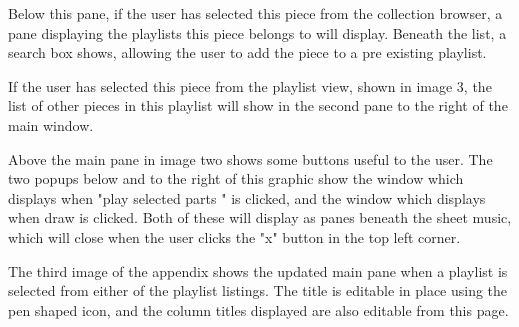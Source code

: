 \documentclass[bibtotocnumbered]{article}
\begin{document}
Below this pane, if the user has selected this piece from the collection browser, a pane displaying the playlists this piece belongs to will display.  Beneath the list, a search box shows, allowing the user to add the piece to a pre existing playlist.

If the user has selected this piece from the playlist view, shown in image 3, the list of other pieces in this playlist will show in the second pane to the right of the main window.

Above the main pane in image two shows some buttons useful to the user. The two popups below and to the right of this graphic show the window which displays when "play selected parts " is clicked, and the window which displays when draw is clicked. Both of these will display as panes beneath the sheet music, which will close when the user clicks the "x" button in the top left corner.

The third image of the appendix shows the updated main pane when a playlist is selected from either of the playlist listings. The title is editable in place using the pen shaped icon, and the column titles displayed are also editable from this page.
\end{document}
